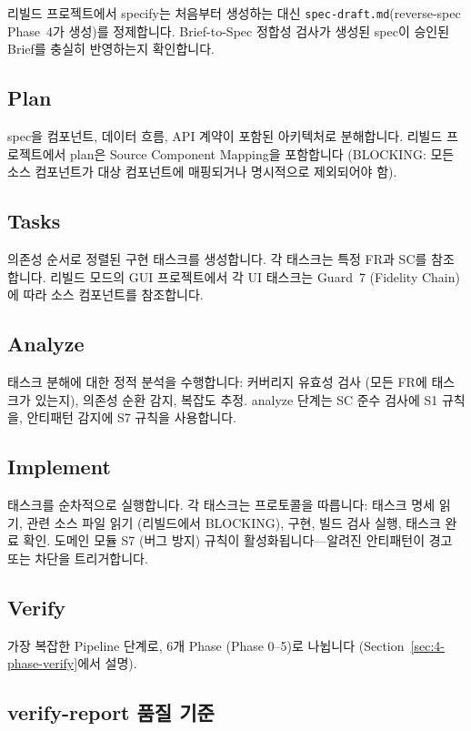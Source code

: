 \documentclass[11pt,a4paper,openright,twoside]{report}
\newcommand{\file}[1]{\texttt{#1}}
\begin{document}
리빌드 프로젝트에서 specify는 처음부터 생성하는 대신 \file{spec-draft.md}(reverse-spec Phase~4가 생성)를 정제합니다. Brief-to-Spec 정합성 검사가 생성된 spec이 승인된 Brief를 충실히 반영하는지 확인합니다.

\subsection{Plan}

spec을 컴포넌트, 데이터 흐름, API 계약이 포함된 아키텍처로 분해합니다. 리빌드 프로젝트에서 plan은 Source Component Mapping을 포함합니다 (BLOCKING: 모든 소스 컴포넌트가 대상 컴포넌트에 매핑되거나 명시적으로 제외되어야 함).

\subsection{Tasks}

의존성 순서로 정렬된 구현 태스크를 생성합니다. 각 태스크는 특정 FR과 SC를 참조합니다. 리빌드 모드의 GUI 프로젝트에서 각 UI 태스크는 Guard~7 (Fidelity Chain)에 따라 소스 컴포넌트를 참조합니다.

\subsection{Analyze}

태스크 분해에 대한 정적 분석을 수행합니다: 커버리지 유효성 검사 (모든 FR에 태스크가 있는지), 의존성 순환 감지, 복잡도 추정. analyze 단계는 SC 준수 검사에 S1 규칙을, 안티패턴 감지에 S7 규칙을 사용합니다.

\subsection{Implement}

태스크를 순차적으로 실행합니다. 각 태스크는 프로토콜을 따릅니다: 태스크 명세 읽기, 관련 소스 파일 읽기 (리빌드에서 BLOCKING), 구현, 빌드 검사 실행, 태스크 완료 확인. 도메인 모듈 S7 (버그 방지) 규칙이 활성화됩니다---알려진 안티패턴이 경고 또는 차단을 트리거합니다.

\subsection{Verify}

가장 복잡한 Pipeline 단계로, 6개 Phase (Phase 0--5)로 나뉩니다 (Section~\ref{sec:4-phase-verify}에서 설명).

\subsection{verify-report 품질 기준}
\end{document}

